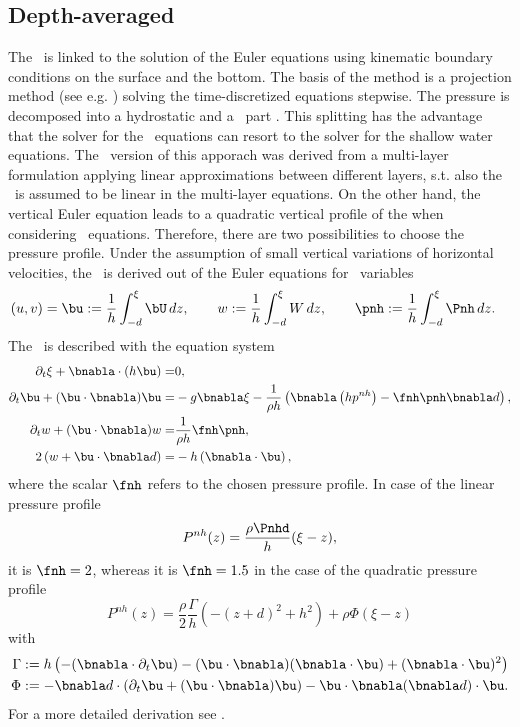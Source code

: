 \subsection{Depth-averaged \nheswe}
The \nheswe\ is linked to the solution of the Euler equations using kinematic boundary conditions on the surface and the bottom. The basis of the method is a projection method (see e.g. \cite{Chorin.1968}) solving the time-discretized equations stepwise. 
The pressure is decomposed into a hydrostatic and a \nh\ part \cite{CasulliStelling.1998, StansbyZhou.1998}. This splitting has the advantage that the solver for the \nh\ equations can resort to the solver for the shallow water equations. 
The \da\ version of this apporach was derived from a multi-layer formulation  \cite{StellingZijlema.2003} applying linear approximations between different layers, s.t. also the \nhp\ is assumed to be linear in the multi-layer equations. On the other hand, the vertical Euler equation leads to a quadratic vertical profile of the \nhp when considering \da\ equations. Therefore, there are two possibilities to choose the pressure profile.
Under the assumption of small vertical variations of horizontal velocities, the \danheswe\ is derived out of the Euler equations for \da\ variables
\begin{align}
  (u,v)=\bu:=\frac{1}{h}\int_{-d}^{\xi}{\bU}\,dz, \qquad w:=\frac{1}{h}\int_{-d}^{\xi}{W}\,dz, \qquad \pnh&:=\frac{1}{h}\int_{-d}^{\xi}{\Pnh}\,dz. \label{eq:def_pnh}
\end{align}
The \danheswe\ is described with the equation system
\begin{align}
\partial_t \xi+\bnabla \cdot (h\bu)=&0, \label{eq:nh_conti} \\
\partial_t \bu+(\bu \cdot \bnabla)\bu=&-g\bnabla \xi-\frac{1}{\rho h}\left(\bnabla \left(hp^{nh} \right) -\fnh\pnh \bnabla d\right), \label{eq:nh_Momxy} \\
\partial_t w+(\bu \cdot \bnabla)w=&\frac{1}{\rho h}\fnh\pnh, \label{eq:nh_Momz} \\
2 \left(w+\bu \cdot \bnabla d \right)=&-h\left(\bnabla \cdot \bu\right), \label{eq:nh_closure}
\end{align} 
where the scalar $\fnh$ refers to the chosen pressure profile. In case of the linear pressure profile
\begin{equation}
  P^{nh}(z)=\frac{\rho \Pnhd}{h}(\xi -z),
\end{equation}
it is $\fnh=2$, whereas it is $\fnh=1.5$ in the case of the quadratic pressure profile
\begin{equation}
 P^{nh}(z)=\frac{\rho}{2}\frac{\Gamma}{h}\left(-(z+d)^2+h^2\right)+\rho\Phi\left(\xi-z\right) \label{eq:Pnh_quadr_z}
\end{equation}
with
\begin{align*}
  \Gamma &:= h\left( -(\bnabla \cdot \partial_t \bu) - (\bu \cdot \bnabla) (\bnabla \cdot \bu) + (\bnabla \cdot \bu)^2 \right) \\
  \Phi &:= - \bnabla d \cdot \left( \partial_t  \bu + (\bu \cdot \bnabla)\bu \right) - \bu \cdot \bnabla(\bnabla d) \cdot \bu.
\end{align*}
For a more detailed derivation see \cite{Jeschke.2016}.


